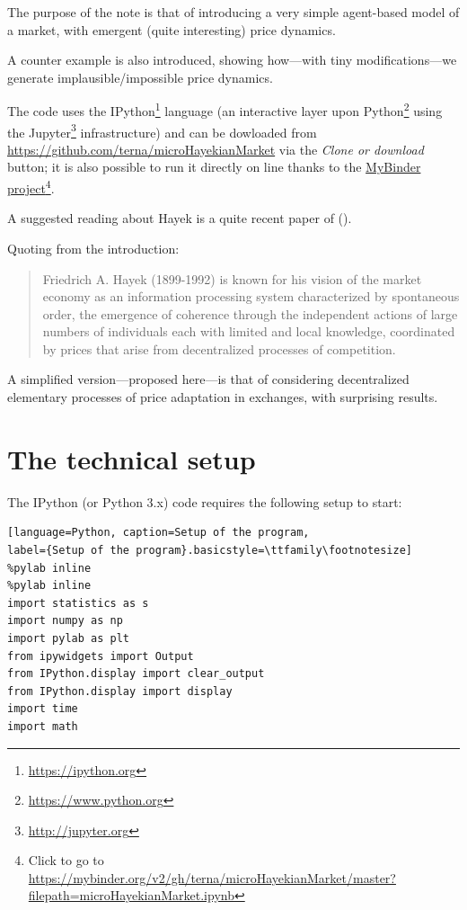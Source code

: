 \documentclass[10pt]{report}
\begin{document}
The purpose of the note is that of introducing a very simple agent-based model of a market, with emergent (quite interesting)  price dynamics.

 A counter example is also introduced, showing how---with tiny modifications---we generate implausible/impossible price dynamics.

The code uses the IPython\footnote{\url{https://ipython.org}} language (an interactive layer upon Python\footnote{\url{https://www.python.org}} using the Jupyter\footnote{\url{http://jupyter.org}} infrastructure) and can be dowloaded from \url{https://github.com/terna/microHayekianMarket} via the \emph{Clone or download} button; it is also possible to run it directly on line thanks to the \href{https://mybinder.org/v2/gh/terna/microHayekianMarket/master?filepath=microHayekianMarket.ipynb}{MyBinder project}\footnote{Click to go to \url{https://mybinder.org/v2/gh/terna/microHayekianMarket/master?filepath=microHayekianMarket.ipynb}}.

A suggested reading about Hayek is a quite recent paper of \citeauthor{10.1257/jep.31.3.215} (\citeyear{10.1257/jep.31.3.215}).

Quoting from the introduction:
\begin{quotation}
Friedrich A. Hayek (1899-1992) is known for his vision of the market economy as an information processing system characterized by spontaneous order, the emergence of coherence through the independent actions of large numbers of individuals each with limited and local knowledge, coordinated by prices that arise from decentralized processes of competition.
\end{quotation}

A simplified version---proposed here---is that of considering decentralized elementary processes of price adaptation in exchanges, with surprising results.

\section{The technical setup}\label{The technical setup}

The IPython (or Python 3.x) code requires the following setup to start:

\begin{lstlisting}[language=Python, caption=Setup of the program, 
label={Setup of the program}.basicstyle=\ttfamily\footnotesize]
%pylab inline
%pylab inline
import statistics as s
import numpy as np
import pylab as plt
from ipywidgets import Output
from IPython.display import clear_output
from IPython.display import display
import time
import math\end{lstlisting}
\end{document}
